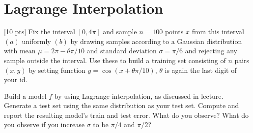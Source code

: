 \documentclass[a4paper]{article}
\theoremstyle{definition}
\newcommand{\1}{\Ind}
\begin{document}
\section{Lagrange Interpolation}
[10 pts]
Fix the interval $[0, 4\pi]$ and sample $n = 100$ points $x$ from this interval $(a)$ uniformly $(b)$ by drawing samples according to a Gaussian distribution with mean $\mu=2\pi-\theta \pi/10$ and standard deviation $\sigma=\pi/6$ and rejecting any sample outside the interval. Use these to build a training set consisting of $n$ pairs $(x, y)$ by setting function $y = \cos(x+\theta \pi/10)$, 
$\theta$ is again the last digit of your id. 
\medskip

Build a model $f$ by using Lagrange interpolation, as discussed in lecture. Generate a test set using the same distribution as your test set. Compute and report the resulting model's train and test error. What do you observe?  What do you observe if you increase $\sigma$ to be $\pi/4$ and $\pi/2$?

 
\end{document}
